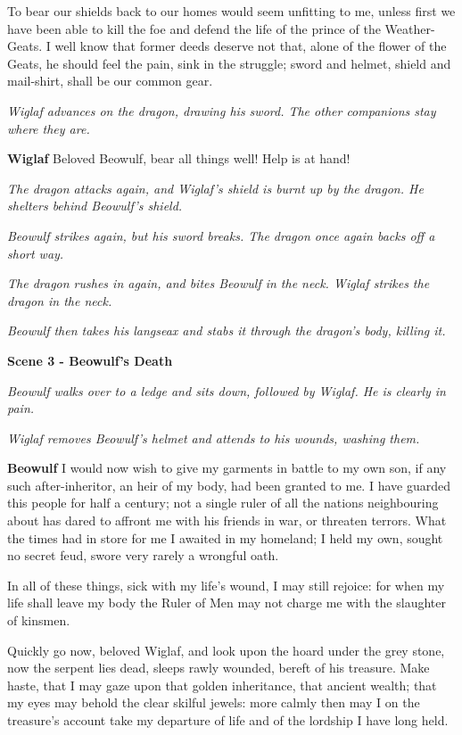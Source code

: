 \documentclass[a4paper]{article}
\begin{document}
{To bear our shields back to our homes
would seem unfitting to me, unless first we have been able
to kill the foe and defend the life
of the prince of the Weather-Geats. I well know
that former deeds deserve not that, alone
of the flower of the Geats, he should feel the pain,
sink in the struggle; sword and helmet,
shield and mail-shirt, shall be our common gear.

\centerline{\textit{Wiglaf advances on the dragon, drawing his sword. The other companions stay where they are.}}

\textbf{Wiglaf} 
Beloved Beowulf, bear all things well!
Help is at hand!

\centerline{\textit{The dragon attacks again, and Wiglaf's shield is burnt up by the dragon. He shelters behind Beowulf's shield.}}
\centerline{\textit{Beowulf strikes again, but his sword breaks. The dragon once again backs off a short way.}}

\centerline{\textit{The dragon rushes in again, and bites Beowulf in the neck. Wiglaf strikes the dragon in the neck.}}
\centerline{\textit{Beowulf then takes his langseax and stabs it through the dragon's body, killing it.}}

\centerline{\textbf{Scene 3 - Beowulf's Death}}
\centerline{\textit{Beowulf walks over to a ledge and sits down, followed by Wiglaf. He is clearly in pain.}}
\centerline{\textit{Wiglaf removes Beowulf's helmet and attends to his wounds, washing them.}}

\textbf{Beowulf} I would now wish to give my garments in battle
to my own son, if any such
after-inheritor, an heir of my body,
had been granted to me. I have guarded this people
for half a century; not a single ruler
of all the nations neighbouring about
has dared to affront me with his friends in war,
or threaten terrors. What the times had in store for me
I awaited in my homeland; I held my own,
sought no secret feud, swore very rarely
a wrongful oath.

In all of these things,
sick with my life’s wound, I may still rejoice:
for when my life shall leave my body
the Ruler of Men may not charge me
with the slaughter of kinsmen.

Quickly go now,
beloved Wiglaf, and look upon the hoard
under the grey stone, now the serpent lies dead,
sleeps rawly wounded, bereft of his treasure.
Make haste, that I may gaze upon that golden inheritance,
that ancient wealth; that my eyes may behold
the clear skilful jewels: more calmly then may I
on the treasure’s account take my departure
of life and of the lordship I have long held.

}
\end{document}
